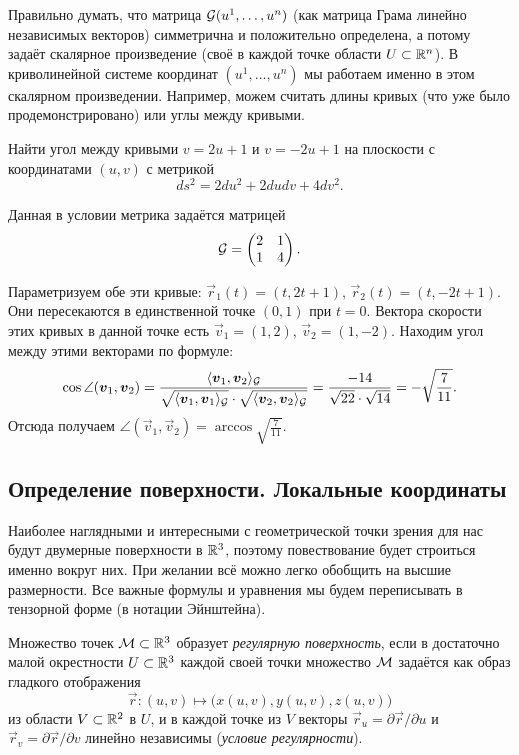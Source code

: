 Правильно думать, что матрица $\mathcal{G}(u^1, \ldots, u^n)$ (как матрица Грама линейно независимых векторов) симметрична и положительно определена, а потому задаёт скалярное произведение (своё в каждой точке области $U \subset \mathbb{R}^n$). В криволинейной системе координат $(u^1, \ldots, u^n)$ мы работаем именно в этом скалярном произведении. Например, можем считать длины кривых (что уже было продемонстрировано) или углы между кривыми.

\begin{problem}
	Найти угол между кривыми $v = 2u + 1$ и $v = -2u + 1$ на плоскости с координатами $(u, v)$ с метрикой
	\[
		ds^2 = 2du^2 + 2dudv + 4dv^2.
	\]
\end{problem}

\begin{solution}
	Данная в условии метрика задаётся матрицей
	\[
		\mathcal{G} =
		\begin{pmatrix}
			2 & 1\\
			1 & 4
		\end{pmatrix}.
	\]

	Параметризуем обе эти кривые: $\vec{r}_1(t) = (t, 2t + 1)$, $\vec{r}_2(t) = (t, -2t + 1)$. Они пересекаются в единственной точке $(0, 1)$ при $t = 0$. Вектора скорости этих кривых в данной точке есть $\vec{v}_1 = (1, 2)$, $\vec{v}_2 = (1, -2)$. Находим угол между этими векторами по формуле:
	\[
		\cos\angle(\boldsymbol{v}_1, \boldsymbol{v}_2) = \frac{\langle\boldsymbol{v}_1, \boldsymbol{v}_2\rangle_{\mathcal{G}}}{\sqrt{\langle\boldsymbol{v}_1, \boldsymbol{v}_1\rangle_{\mathcal{G}}} \cdot \sqrt{\langle\boldsymbol{v}_2, \boldsymbol{v}_2\rangle_{\mathcal{G}}}} = \frac{-14}{\sqrt{22} \cdot \sqrt{14}} = -\sqrt{\frac{7}{11}}.
	\]
	Отсюда получаем $\angle(\vec{v}_1, \vec{v}_2) = \arccos\sqrt{\frac{7}{11}}$.
\end{solution}

\subsection{Определение поверхности. Локальные координаты}

Наиболее наглядными и интересными с геометрической точки зрения для нас будут двумерные поверхности в $\mathbb{R}^3$, поэтому повествование будет строиться именно вокруг них. При желании всё можно легко обобщить на высшие размерности. Все важные формулы и уравнения мы будем переписывать в тензорной форме (в нотации Эйнштейна).

\begin{definition}
	Множество точек $\mathcal{M} \subset \mathbb{R}^3$ образует \textit{регулярную поверхность}, если в достаточно малой окрестности $U \subset \mathbb{R}^3$ каждой своей точки множество $\mathcal{M}$ задаётся как образ гладкого отображения
	\[
		\vec{r}\colon (u, v) \mapsto \big(x(u, v), y(u, v), z(u, v)\big)
	\]
	из области $V \subset \mathbb{R}^2$ в $U$, и в каждой точке из $V$ векторы $\vec{r}_u = \partial\vec{r} / \partial u$ и $\vec{r}_v = \partial\vec{r} / {\partial v}$ линейно независимы (\textit{условие регулярности}).
\end{definition}

